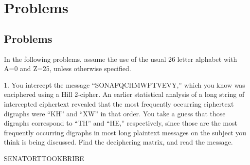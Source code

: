 \chapter*{Problems}
\section{Problems}
In the following problems, assume the use of the usual 26 letter alphabet with A=0 and Z=25, unless otherwise specified.


1. You intercept the message “SONAFQCHMWPTVEVY,” which you know was enciphered using a Hill 2-cipher. 
An earlier statistical analysis of a long string of intercepted ciphertext revealed that the most frequently occurring ciphertext digraphs were “KH” and “XW” in that order. 
You take a guess that those digraphs correspond to “TH” and “HE,” respectively, since those are the most frequently occurring digraphs in most long plaintext messages on the subject you think is being discussed.
Find the deciphering matrix, and read the message.

SENATORTTOOKBRIBE




